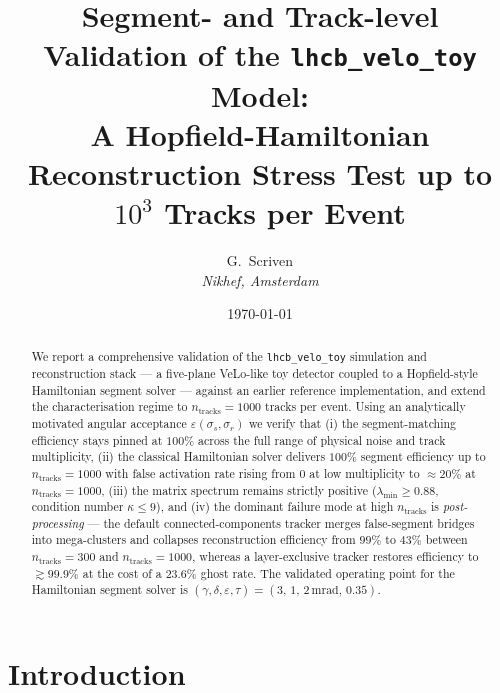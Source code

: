 \documentclass[11pt,a4paper]{article}
\title{Segment- and Track-level Validation of the \texttt{lhcb\_velo\_toy} Model:\\
       A Hopfield-Hamiltonian Reconstruction Stress Test up to $10^3$ Tracks per Event}
\author{G.~Scriven\\[2pt]\textit{Nikhef, Amsterdam}}
\date{\today}
\newcommand{\nt}{n_\text{tracks}}
\newcommand{\sss}{\sigma_s}
\newcommand{\srr}{\sigma_r}
\newcommand{\eps}{\varepsilon}
\begin{document}
\maketitle

\begin{abstract}
We report a comprehensive validation of the \texttt{lhcb\_velo\_toy} simulation and
reconstruction stack --- a five-plane VeLo-like toy detector coupled to a
Hopfield-style Hamiltonian segment solver --- against an earlier reference
implementation, and extend the characterisation regime to $\nt = 1000$
tracks per event. Using an analytically motivated angular acceptance
$\eps(\sss,\srr)$ we verify that (i) the segment-matching efficiency
stays pinned at $100\%$ across the full range of physical noise and track
multiplicity, (ii) the classical Hamiltonian solver delivers $100\%$
segment efficiency up to $\nt = 1000$ with false activation rate rising
from $0$ at low multiplicity to $\approx 20\%$ at $\nt=1000$, (iii) the
matrix spectrum remains strictly positive ($\lambda_\mathrm{min} \geq 0.88$, condition
number $\kappa \leq 9$), and (iv) the dominant failure mode at high
$\nt$ is \emph{post-processing} --- the default connected-components
tracker merges false-segment bridges into mega-clusters and collapses
reconstruction efficiency from $99\%$ to $43\%$ between $\nt = 300$ and
$\nt = 1000$, whereas a layer-exclusive tracker restores efficiency to
$\gtrsim 99.9\%$ at the cost of a $23.6\%$ ghost rate. The validated
operating point for the Hamiltonian segment solver is
$(\gamma,\delta,\eps,\tau) = (3,\,1,\,2\,\mathrm{mrad},\,0.35)$.
\end{abstract}

\section{Introduction}\label{sec:intro}
\end{document}
